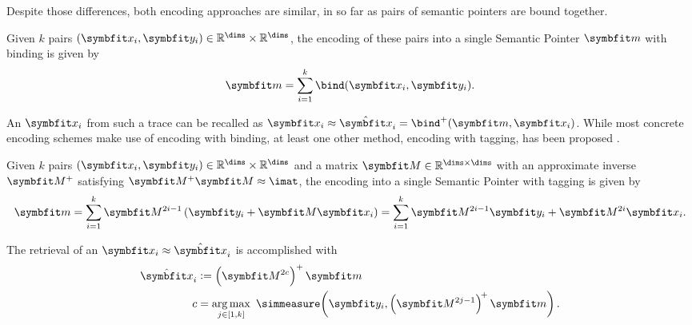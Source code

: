 Despite those differences, both encoding approaches are similar, in so far as pairs of semantic pointers are bound together.
\begin{defn}
    Given $k$ pairs $(\vc x_i, \vc y_i) \in \mathbb{R}^{\dims} \times \mathbb{R}^{\dims}$, the encoding of these pairs into a single Semantic Pointer $\vc m$ with binding is given by
    \begin{equation}
        \vc m = \sum_{i=1}^k \bind(\vc x_i, \vc y_i) \text{.}
    \end{equation}
\end{defn}
An $\vc x_i$ from such a trace can be recalled as $\vc x_i \approx \hat{\vc x}_i = \bind^+(\vc m, \vc x_i)$.
While most concrete encoding schemes make use of encoding with binding, at least one other method, encoding with tagging, has been proposed \parencite{recchia2015}.
\begin{defn}
    Given $k$ pairs $(\vc x_i, \vc y_i) \in \mathbb{R}^{\dims} \times \mathbb{R}^{\dims}$ and a matrix $\mat M \in \mathbb{R}^{\dims \times \dims}$ with an approximate inverse $\mat M^+$ satisfying $\mat M^+ \mat M \approx \imat$, the encoding into a single Semantic Pointer with tagging is given by
    \begin{equation}
        \vc m = \sum_{i=1}^k \mat M^{2i-1} \del{\vc y_i + \mat M \vc x_i} = \sum_{i=1}^k \mat M^{2i-1} \vc y_i + \mat M^{2i} \vc x_i \text{.}
    \end{equation}
\end{defn}
The retrieval of an $\vc x_i \approx \hat{\vc x}_i$ is accomplished with
\begin{align}
    \hat{\vc x}_i &:= \del{\mat M^{2c}}^+ \vc m \\
    c &= \argmax_{j \in \sbr{1, k}}\ \simmeasure\!\del{\vc y_i, \del{\mat M^{2j-1}}^{\!+} \vc m} \text{.}
\end{align}

